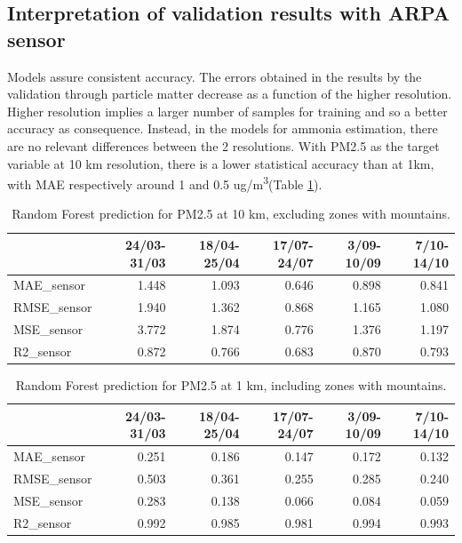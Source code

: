 \subsection{Interpretation of validation results with ARPA sensor}
Models assure consistent accuracy.
The errors obtained in the results by the validation through particle matter decrease as a function of the higher resolution.
Higher resolution implies a larger number of samples for training and so a better accuracy as consequence.
Instead, in the models for ammonia estimation, there are no relevant differences between the 2 resolutions.
With PM2.5 as the target variable at 10 km resolution, there is a lower statistical accuracy than at 1km, with MAE respectively around 1 and 0.5 ug/m\textsuperscript{3}(Table \ref{tab:res1km}). 
\begin{table}[H]
\begin{tabular}{lrrrrr}
\toprule
  &  24/03-31/03 &  18/04-25/04 &  17/07-24/07 &  3/09-10/09 &  7/10-14/10 \\
\midrule
  MAE\_sensor &        1.448 &        1.093 &        0.646 &       0.898 &       0.841 \\
RMSE\_sensor &        1.940 &        1.362 &        0.868 &       1.165 &       1.080 \\
 MSE\_sensor &        3.772 &        1.874 &        0.776 &       1.376 &       1.197 \\
  R2\_sensor &        0.872 &        0.766 &        0.683 &       0.870 &       0.793 \\
\bottomrule
\end{tabular}
\caption{Random Forest prediction for PM2.5 at 10 km, excluding zones with mountains.}
\end{table}
\begin{table}[H]
\begin{tabular}{lrrrrr}
\toprule
  &  24/03-31/03 &  18/04-25/04 &  17/07-24/07 &  3/09-10/09 &  7/10-14/10 \\
\midrule
  MAE\_sensor &        0.251 &        0.186 &        0.147 &       0.172 &       0.132 \\
RMSE\_sensor &        0.503 &        0.361 &        0.255 &       0.285 &       0.240 \\
 MSE\_sensor &        0.283 &        0.138 &        0.066 &       0.084 &       0.059 \\
  R2\_sensor &        0.992 &        0.985 &        0.981 &       0.994 &       0.993 \\
\bottomrule
\end{tabular}
\caption{Random Forest prediction for PM2.5 at 1 km, including zones with mountains.}
\label{tab:res1km}
\end{table}

